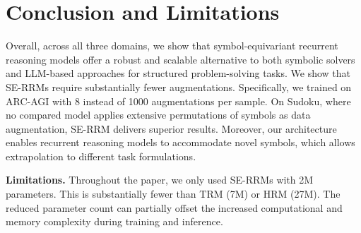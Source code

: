 \documentclass{article}
\theoremstyle{plain}
\theoremstyle{definition}
\theoremstyle{remark}
\renewcommand{\paragraph}[1]{\textbf{#1}\;}
\begin{document}
\section{Conclusion and Limitations}
Overall, across all three domains, we show that symbol-equivariant recurrent reasoning models offer a robust and scalable alternative to both symbolic solvers and LLM-based approaches for structured problem-solving tasks. We show that SE-RRMs require substantially fewer augmentations. Specifically, we trained on ARC-AGI with 8 instead of 1000 augmentations per sample. On Sudoku, where no compared model applies extensive permutations of symbols as data augmentation, SE-RRM delivers superior results. Moreover, our architecture enables recurrent reasoning models to accommodate novel symbols, which allows extrapolation to different task formulations.

\paragraph{Limitations.} Throughout the paper, we only 
used SE-RRMs with 2M parameters. This is substantially 
fewer than TRM (7M) or HRM (27M). The reduced parameter 
count can partially offset the increased computational 
and memory complexity during training and inference. 





\end{document}
